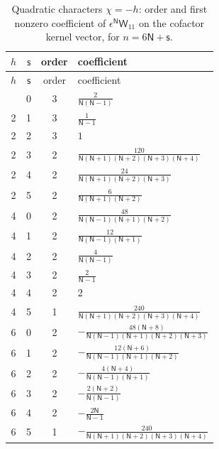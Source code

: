 \documentclass{amsart}
\theoremstyle{definition}
\theoremstyle{remark}
\numberwithin{equation}{section}
\begin{document}
{\small\renewcommand{\arraystretch}{1.9}
\begin{longtable}{cccl}
\caption{Quadratic characters $\chi=-h$: order and first nonzero coefficient of $\epsilon^{\mathsf N}\mathsf W_{11}$ on the cofactor kernel vector, for $n=6\mathsf N+\mathsf s$.}\label{tab:quadall}\\
\toprule $h$&$\mathsf s$&order&coefficient\\\midrule\endfirsthead
\toprule $h$&$\mathsf s$&order&coefficient\\\midrule\endhead
\bottomrule\endfoot
2&0&3&$\displaystyle \frac{2}{\mathsf N(\mathsf N - 1)}$\\
2&1&3&$\displaystyle \frac{1}{\mathsf N - 1}$\\
2&2&3&$\displaystyle 1$\\
2&3&2&$\displaystyle \frac{120}{\mathsf N(\mathsf N + 1)(\mathsf N + 2)(\mathsf N + 3)(\mathsf N + 4)}$\\
2&4&2&$\displaystyle \frac{24}{\mathsf N(\mathsf N + 1)(\mathsf N + 2)(\mathsf N + 3)}$\\
2&5&2&$\displaystyle \frac{6}{\mathsf N(\mathsf N + 1)(\mathsf N + 2)}$\\
4&0&2&$\displaystyle \frac{48}{\mathsf N(\mathsf N - 1)(\mathsf N + 1)(\mathsf N + 2)}$\\
4&1&2&$\displaystyle \frac{12}{\mathsf N(\mathsf N - 1)(\mathsf N + 1)}$\\
4&2&2&$\displaystyle \frac{4}{\mathsf N(\mathsf N - 1)}$\\
4&3&2&$\displaystyle \frac{2}{\mathsf N - 1}$\\
4&4&2&$\displaystyle 2$\\
4&5&1&$\displaystyle \frac{240}{\mathsf N(\mathsf N + 1)(\mathsf N + 2)(\mathsf N + 3)(\mathsf N + 4)}$\\
6&0&2&$\displaystyle -\frac{48(\mathsf N + 8)}{\mathsf N(\mathsf N - 1)(\mathsf N + 1)(\mathsf N + 2)(\mathsf N + 3)}$\\
6&1&2&$\displaystyle -\frac{12(\mathsf N + 6)}{\mathsf N(\mathsf N - 1)(\mathsf N + 1)(\mathsf N + 2)}$\\
6&2&2&$\displaystyle -\frac{4(\mathsf N + 4)}{\mathsf N(\mathsf N - 1)(\mathsf N + 1)}$\\
6&3&2&$\displaystyle -\frac{2(\mathsf N + 2)}{\mathsf N(\mathsf N - 1)}$\\
6&4&2&$\displaystyle -\frac{2\mathsf N}{\mathsf N - 1}$\\
6&5&1&$\displaystyle -\frac{240}{\mathsf N(\mathsf N + 1)(\mathsf N + 2)(\mathsf N + 3)(\mathsf N + 4)}$\\

\end{longtable}}
\end{document}
